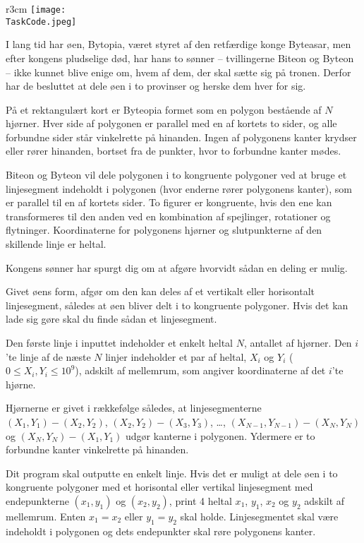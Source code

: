 \documentclass{boi2014-dk}
\renewcommand{\TaskCode}{demarcation}
\begin{document}
    \begin{wrapfigure}{r}{3cm}
        \vspace{-24pt}
		\texttt{[image: \\TaskCode.jpeg]}
	\end{wrapfigure}

    I lang tid har øen, Bytopia, været styret af den retfærdige konge Byteasar,
    men efter kongens pludselige død, har hans to sønner -- tvillingerne Biteon
    og Byteon -- ikke kunnet blive enige om, hvem af dem, der skal sætte sig på
    tronen. Derfor har de besluttet at dele øen i to provinser og herske dem
    hver for sig.

    På et rektangulært kort er Byteopia formet som en polygon bestående af $N$
    hjørner. Hver side af polygonen er parallel med en af kortets to sider, og
    alle forbundne sider står vinkelrette på hinanden. Ingen af polygonens kanter
    krydser eller rører hinanden, bortset fra de punkter, hvor to forbundne
    kanter mødes.

    Biteon og Byteon vil dele
    polygonen i to kongruente polygoner ved at bruge et linjesegment indeholdt i
    polygonen (hvor enderne rører polygonens kanter), som er parallel til en af
    kortets sider. To figurer er kongruente, hvis den ene kan transformeres til
    den anden ved en kombination af spejlinger, rotationer og flytninger.
    Koordinaterne for polygonens hjørner og slutpunkterne af den skillende linje
    er heltal.


    Kongens sønner har spurgt dig om at afgøre hvorvidt sådan en deling er mulig.

    \Task

    Givet øens form, afgør om den kan deles af et vertikalt eller horisontalt
    linjesegment, således at øen bliver delt i to kongruente polygoner. Hvis det
    kan lade sig gøre skal du finde sådan et linjesegment.

    \Input
    Den første linje i inputtet indeholder et enkelt heltal $N$, antallet af
    hjørner. Den $i$'te linje af de næste $N$ linjer indeholder et par af
    heltal, $X_i$ og $Y_i$ ($0\le X_i,Y_i\le 10^9$), adskilt af mellemrum,
    som angiver koordinaterne af det $i$'te hjørne.

    Hjørnerne er givet i rækkefølge således, at linjesegmenterne
    $(X_1,Y_1)-(X_2,Y_2)$, $(X_2,Y_2)-(X_3,Y_3)$, \ldots,
    $(X_{N-1},Y_{N-1})-(X_N,Y_N)$ og $(X_N,Y_N)-(X_1,Y_1)$ udgør kanterne i
    polygonen. Ydermere er to forbundne kanter vinkelrette på hinanden.

	\Output
    Dit program skal outputte en enkelt linje. Hvis det er muligt at dele øen i
    to kongruente polygoner med et horisontal eller vertikal linjesegment med
    endepunkterne $(x_1,y_1)$ og $(x_2,y_2)$, print 4 heltal $x_1$, $y_1$,
    $x_2$ og $y_2$ adskilt af mellemrum. Enten $x_1 = x_2$ eller $y_1 = y_2$
    skal holde. Linjesegmentet skal være indeholdt i polygonen og dets
    endepunkter skal røre polygonens kanter.
\end{document}
